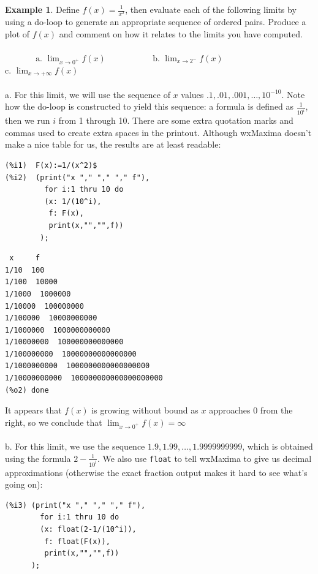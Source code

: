 \documentclass[10.5pt,twoside]{report}
\theoremstyle{definition}
\newtheorem{exmp}{Example}[section]
\begin{document}
\begin{exmp}

Define $f(x)=\frac{1}{x^2}$, then evaluate each of the following limits by using a do-loop to generate an appropriate sequence of ordered pairs.  Produce a plot of $f(x)$ and comment on how it relates to the limits you have computed.\\
${}$\\
 
\verb|       |$\text{a.  } \lim_{x \to 0^{+}}f(x)$ 
\verb|          |$\text{b.  } \lim_{x \to 2^{-}}f(x)$  
\verb|          |$\text{c.  } \lim_{x \to +\infty}f(x)$\\

${}$\\
a. For this limit, we will use the sequence of $x$ values $.1,.01,.001,\dots,10^{-10}$.  Note how the do-loop is constructed to yield this sequence:  a formula is defined as $\frac{1}{10^i}$, then we run $i$ from 1 through 10. There are some extra quotation marks and commas used to create extra spaces in the printout.  Although wxMaxima doesn't make a nice table for us, the results are at least readable:

\begin{verbatim}
(%i1)  F(x):=1/(x^2)$
(%i2)  (print("x "," "," "," f"),
         for i:1 thru 10 do
         (x: 1/(10^i),
          f: F(x),
          print(x,"","",f))
        );
\end{verbatim}
\pagebreak
\begin{verbatim}     
 x     f
1/10  100
1/100  10000
1/1000  1000000
1/10000  100000000
1/100000  10000000000
1/1000000  1000000000000
1/10000000  100000000000000
1/100000000  10000000000000000
1/1000000000  1000000000000000000
1/10000000000  100000000000000000000
(%o2) done
\end{verbatim}

It appears that $f(x)$ is growing without bound as $x$ approaches 0 from the right, so we conclude that $\lim_{x \to 0^{+}}f(x)=\infty$ \\
${}$\\
b. For this limit, we use the sequence $1.9,1.99,\dots,1.9999999999$, which is obtained using the formula $2-\frac{1}{10^i}$.  We also use \verb|float| to tell wxMaxima to give us decimal approximations (otherwise the exact fraction output makes it hard to see what's going on):

\begin{verbatim}
(%i3) (print("x "," "," "," f"),
        for i:1 thru 10 do
        (x: float(2-1/(10^i)),
         f: float(F(x)),
         print(x,"","",f))
      );
     

\end{verbatim}
\end{exmp}
\end{document}
